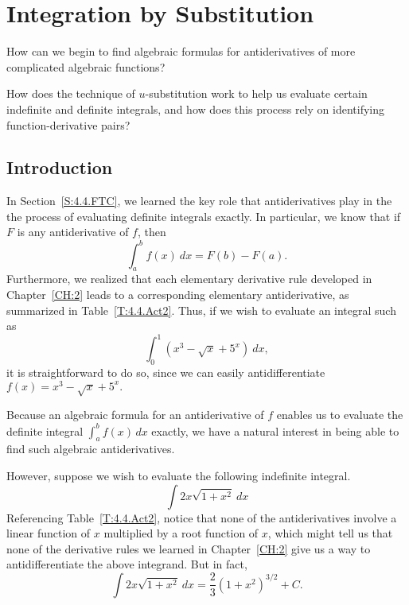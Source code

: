 \section{Integration by Substitution} \label{S:4.6.Substitution}

\begin{goals}
\item How can we begin to find algebraic formulas for antiderivatives of more complicated algebraic functions?
\item How does the technique of $u$-substitution work to help us evaluate certain indefinite and definite integrals, and how does this process rely on identifying function-derivative pairs?
\end{goals}

\subsection*{Introduction}

In Section~\ref{S:4.4.FTC}, we learned the key role that antiderivatives play in the the process of evaluating definite integrals exactly.  In particular, we know that if $F$ is any antiderivative of $f$, then
\[ \int_a^b f(x) \ dx = F(b) - F(a). \]
Furthermore, we realized that each elementary derivative rule developed in Chapter~\ref{CH:2} leads to a corresponding elementary antiderivative, as summarized in Table~\ref{T:4.4.Act2}.  Thus, if we wish to evaluate an integral such as 
\[ \int_0^1 \left(x^3 - \sqrt{x} + 5^x \right) \ dx, \]
it is straightforward to do so, since we can easily antidifferentiate $f(x) = x^3 - \sqrt{x} + 5^x.$ 

Because an algebraic formula for an antiderivative of $f$ enables us to evaluate the definite integral $\int_a^b f(x) \, dx$ exactly, we have a natural interest in being able to find such algebraic antiderivatives.  

However, suppose we wish to evaluate the following indefinite integral.
\[ \int 2x \sqrt{1 + x^2} \ dx \]
Referencing Table~\ref{T:4.4.Act2}, notice that none of the antiderivatives involve a linear function of $x$ multiplied by a root function of $x$, which might tell us that none of the derivative rules we learned in Chapter~\ref{CH:2} give us a way to antidifferentiate the above integrand.  But in fact,
\[ \int 2x \sqrt{1 + x^2} \ dx = \frac{2}{3}\left( 1 + x^2 \right)^{3/2} + C.  \]

